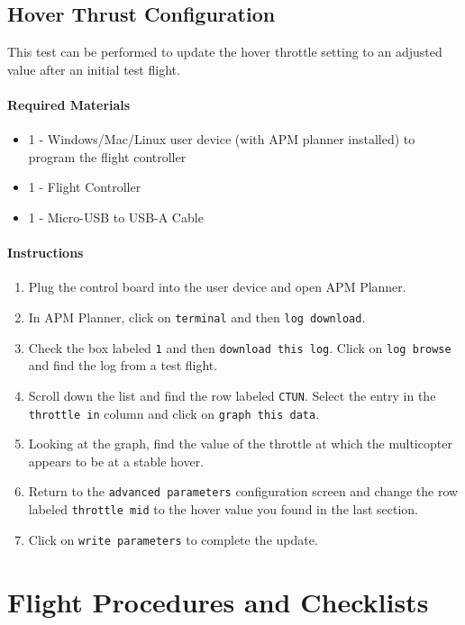 \documentclass[10pt,letterpaper]{article}
\begin{document}
\subsection{Hover Thrust Configuration}

This test can be performed to update the hover throttle setting to an adjusted value after an initial test flight.

\paragraph{Required Materials}
\begin{itemize}
    \item 1 - Windows/Mac/Linux user device (with APM planner installed) to program the flight controller 
\item 1 - Flight Controller
\item 1 - Micro-USB to USB-A Cable
\end{itemize}

\paragraph{Instructions}
\begin{enumerate}
    \item Plug the control board into the user device and open APM Planner.
    \item In APM Planner, click on \texttt{terminal} and then \texttt{log download}. 
    \item Check the box labeled \texttt{1} and then \texttt{download this log}. Click on \texttt{log browse} and find the log from a test flight. 
    \item Scroll down the list and find the row labeled \texttt{CTUN}. Select the entry in the \texttt{throttle in} column and click on \texttt{graph this data}.
    \item Looking at the graph, find the value of the throttle at which the multicopter appears to be at a stable hover.
    \item Return to the \texttt{advanced parameters} configuration screen and change the row labeled \texttt{throttle mid} to the hover value you found in the last section. 
    \item Click on \texttt{write parameters} to complete the update.

\end{enumerate}

\clearpage
\section{Flight Procedures and Checklists}

\end{document}
